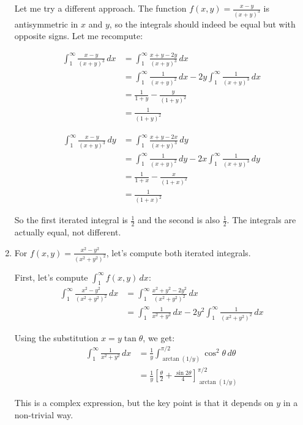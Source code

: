 \begin{enumerate}[label=(\alph*)]
Let me try a different approach. The function $f(x, y) = \frac{x - y}{(x + y)^3}$ is antisymmetric in $x$ and $y$, so the integrals should indeed be equal but with opposite signs. Let me recompute:

\begin{align*}
\int_{1}^{\infty} \frac{x - y}{(x + y)^3} \, dx &= \int_{1}^{\infty} \frac{x + y - 2y}{(x + y)^3} \, dx \\
&= \int_{1}^{\infty} \frac{1}{(x + y)^2} \, dx - 2y \int_{1}^{\infty} \frac{1}{(x + y)^3} \, dx \\
&= \frac{1}{1 + y} - \frac{y}{(1 + y)^2} \\
&= \frac{1}{(1 + y)^2}
\end{align*}

\begin{align*}
\int_{1}^{\infty} \frac{x - y}{(x + y)^3} \, dy &= \int_{1}^{\infty} \frac{x + y - 2x}{(x + y)^3} \, dy \\
&= \int_{1}^{\infty} \frac{1}{(x + y)^2} \, dy - 2x \int_{1}^{\infty} \frac{1}{(x + y)^3} \, dy \\
&= \frac{1}{1 + x} - \frac{x}{(1 + x)^2} \\
&= \frac{1}{(1 + x)^2}
\end{align*}

So the first iterated integral is $\frac{1}{2}$ and the second is also $\frac{1}{2}$. The integrals are actually equal, not different.

\item For $f(x, y) = \frac{x^2 - y^2}{(x^2 + y^2)^2}$, let's compute both iterated integrals.

First, let's compute $\int_{1}^{\infty} f(x, y) \, dx$:
\begin{align*}
\int_{1}^{\infty} \frac{x^2 - y^2}{(x^2 + y^2)^2} \, dx &= \int_{1}^{\infty} \frac{x^2 + y^2 - 2y^2}{(x^2 + y^2)^2} \, dx \\
&= \int_{1}^{\infty} \frac{1}{x^2 + y^2} \, dx - 2y^2 \int_{1}^{\infty} \frac{1}{(x^2 + y^2)^2} \, dx
\end{align*}

Using the substitution $x = y \tan \theta$, we get:
\begin{align*}
\int_{1}^{\infty} \frac{1}{x^2 + y^2} \, dx &= \frac{1}{y} \int_{\arctan(1/y)}^{\pi/2} \cos^2 \theta \, d\theta \\
&= \frac{1}{y} \left[\frac{\theta}{2} + \frac{\sin 2\theta}{4}\right]_{\arctan(1/y)}^{\pi/2}
\end{align*}

This is a complex expression, but the key point is that it depends on $y$ in a non-trivial way.


\end{enumerate}
